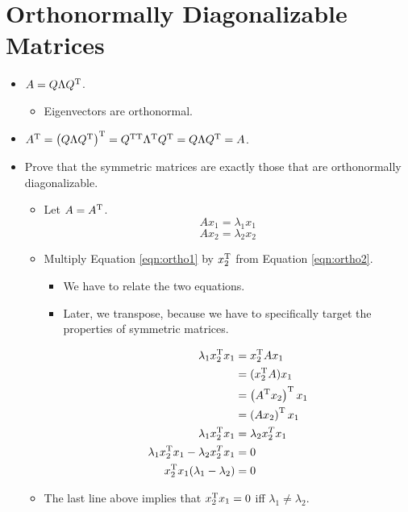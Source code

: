 \documentclass{article}
\begin{document}
\section*{Orthonormally Diagonalizable Matrices}
\begin{itemize}
    \item {}$A=Q\Lambda Q^{\text{T}}$.
    \begin{itemize}
        \item Eigenvectors are orthonormal.
    \end{itemize}
    \item $A^{\text{T}} = \left( Q\Lambda Q^{\text{T}} \right)^{\text{T}} = Q^{\text{T}\text{T}}\Lambda^{\text{T}} Q^{\text{T}} = Q\Lambda Q^{\text{T}} = A$.
    \item Prove that the symmetric matrices are exactly those that are orthonormally diagonalizable.
    \begin{itemize}
        \item Let $A = A^{\text{T}}$.
        \begin{equation}\label{eqn:ortho1}
            Ax_1 = \lambda_1x_1
        \end{equation}
        \begin{equation}\label{eqn:ortho2}
            Ax_2 = \lambda_2x_2
        \end{equation}
        \item Multiply Equation \ref{eqn:ortho1} by $x_2^{\text{T}}$ from Equation \ref{eqn:ortho2}.
        \begin{itemize}
            \item We have to relate the two equations.
            \item Later, we transpose, because we have to specifically target the properties of symmetric matrices.
        \end{itemize}
        \begin{align*}
            \lambda_1x_2^{\text{T}} x_1 &= x_2^{\text{T}} Ax_1\\
            &= (x_2^{\text{T}} A)x_1\\
            &= \left( A^{\text{T}} x_2 \right)^{\text{T}} x_1\\
            &= \left( A x_2 \right)^{\text{T}} x_1\\
            \lambda_1x_2^{\text{T}} x_1 &= \lambda_2x_2^T x_1\\
            \lambda_1x_2^{\text{T}} x_1-\lambda_2x_2^T x_1 &= 0\\
            x_2^{\text{T}} x_1(\lambda_1-\lambda_2) &= 0
        \end{align*}
        \item The last line above implies that $x_2^{\text{T}} x_1 = 0$ iff $\lambda_1\neq\lambda_2$.

\end{itemize}
\end{itemize}
\end{document}
